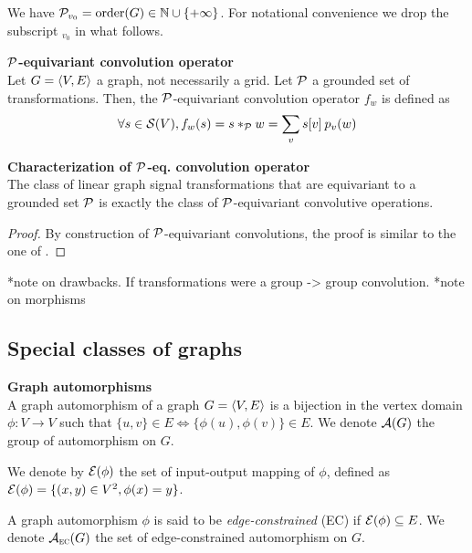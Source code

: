 We have $\cp_{v_0} = \order(G) \in \bbn \cup \{+\infty\}$. For notational convenience we drop the subscript $_{v_0}$ in what follows.

\begin{definition}\textbf{$\cp$-equivariant convolution operator}\\
Let $\gve$ a graph, not necessarily a grid. Let $\cp$ a grounded set of transformations. Then, the  $\cp$-equivariant convolution operator $f_w$ is defined as
\begin{gather*}
\forall s \in \cs(V), f_w(s) = s \ast_{\cp} w = \displaystyle \sum_v s[v] \h{2} p_v(w)
\end{gather*}
\end{definition}

\begin{claim}\textbf{Characterization of $\cp$-eq. convolution operator}\\
The class of linear graph signal transformations that are equivariant to a grounded set $\cp$ is exactly the class of $\cp$-equivariant convolutive operations.
\end{claim}

\begin{proof}
By construction of $\cp$-equivariant convolutions, the proof is similar to the one of .
\end{proof}



*note on drawbacks. If transformations were a group -> group convolution.
*note on morphisms

\subsection{Special classes of graphs}


\begin{definition}\textbf{Graph automorphisms}\\
A graph automorphism of a graph $\gve$ is a bijection in the vertex domain $\phi: V \rightarrow V$ such that $\{u,v\} \in E \Leftrightarrow \{\phi(u), \phi(v)\} \in E$. We denote $\ca(G)$ the group of automorphism on $G$.

We denote by $\ce(\phi)$ the set of input-output mapping of $\phi$, defined as $\ce(\phi) = \{ (x,y) \in V^2, \phi(x) = y \}$.

A graph automorphism $\phi$ is said to be \emph{edge-constrained} (EC) if $\ce(\phi) \subseteq E$. We denote $\ca_{\EC}(G)$ the set of edge-constrained automorphism on $G$.
\end{definition}

